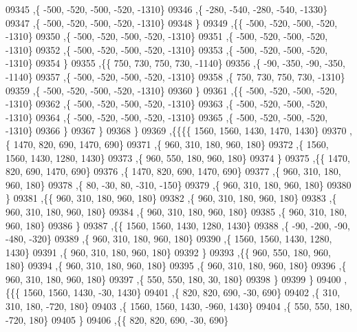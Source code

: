 \begin{DoxyCode}
09345     ,\{  -500,  -520,  -500,  -520, -1310\}
09346     ,\{  -280,  -540,  -280,  -540, -1330\}
09347     ,\{  -500,  -520,  -500,  -520, -1310\}
09348     \}
09349    ,\{\{  -500,  -520,  -500,  -520, -1310\}
09350     ,\{  -500,  -520,  -500,  -520, -1310\}
09351     ,\{  -500,  -520,  -500,  -520, -1310\}
09352     ,\{  -500,  -520,  -500,  -520, -1310\}
09353     ,\{  -500,  -520,  -500,  -520, -1310\}
09354     \}
09355    ,\{\{   750,   730,   750,   730, -1140\}
09356     ,\{   -90,  -350,   -90,  -350, -1140\}
09357     ,\{  -500,  -520,  -500,  -520, -1310\}
09358     ,\{   750,   730,   750,   730, -1310\}
09359     ,\{  -500,  -520,  -500,  -520, -1310\}
09360     \}
09361    ,\{\{  -500,  -520,  -500,  -520, -1310\}
09362     ,\{  -500,  -520,  -500,  -520, -1310\}
09363     ,\{  -500,  -520,  -500,  -520, -1310\}
09364     ,\{  -500,  -520,  -500,  -520, -1310\}
09365     ,\{  -500,  -520,  -500,  -520, -1310\}
09366     \}
09367    \}
09368   \}
09369  ,\{\{\{\{  1560,  1560,  1430,  1470,  1430\}
09370     ,\{  1470,   820,   690,  1470,   690\}
09371     ,\{   960,   310,   180,   960,   180\}
09372     ,\{  1560,  1560,  1430,  1280,  1430\}
09373     ,\{   960,   550,   180,   960,   180\}
09374     \}
09375    ,\{\{  1470,   820,   690,  1470,   690\}
09376     ,\{  1470,   820,   690,  1470,   690\}
09377     ,\{   960,   310,   180,   960,   180\}
09378     ,\{    80,   -30,    80,  -310,  -150\}
09379     ,\{   960,   310,   180,   960,   180\}
09380     \}
09381    ,\{\{   960,   310,   180,   960,   180\}
09382     ,\{   960,   310,   180,   960,   180\}
09383     ,\{   960,   310,   180,   960,   180\}
09384     ,\{   960,   310,   180,   960,   180\}
09385     ,\{   960,   310,   180,   960,   180\}
09386     \}
09387    ,\{\{  1560,  1560,  1430,  1280,  1430\}
09388     ,\{   -90,  -200,   -90,  -480,  -320\}
09389     ,\{   960,   310,   180,   960,   180\}
09390     ,\{  1560,  1560,  1430,  1280,  1430\}
09391     ,\{   960,   310,   180,   960,   180\}
09392     \}
09393    ,\{\{   960,   550,   180,   960,   180\}
09394     ,\{   960,   310,   180,   960,   180\}
09395     ,\{   960,   310,   180,   960,   180\}
09396     ,\{   960,   310,   180,   960,   180\}
09397     ,\{   550,   550,   180,    30,   180\}
09398     \}
09399    \}
09400   ,\{\{\{  1560,  1560,  1430,   -30,  1430\}
09401     ,\{   820,   820,   690,   -30,   690\}
09402     ,\{   310,   310,   180,  -720,   180\}
09403     ,\{  1560,  1560,  1430,  -960,  1430\}
09404     ,\{   550,   550,   180,  -720,   180\}
09405     \}
09406    ,\{\{   820,   820,   690,   -30,   690\}

\end{DoxyCode}
